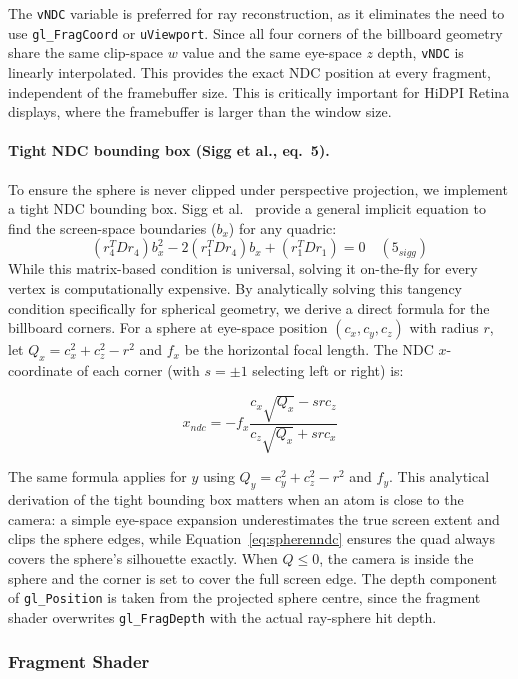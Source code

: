 \documentclass[12pt, a4paper]{article}
\begin{document}
The \texttt{vNDC} variable is preferred for ray reconstruction, as it eliminates the need to use \texttt{gl\_FragCoord} or \texttt{uViewport}. Since all four corners of the billboard geometry share the same clip-space $w$ value and the same eye-space $z$ depth, \texttt{vNDC} is linearly interpolated. This provides the exact NDC position at every fragment, independent of the framebuffer size. This is critically important for HiDPI Retina displays, where the framebuffer is larger than the window size.

\paragraph{Tight NDC bounding box (Sigg et al., eq.~5).}\label{sec:ndcbox}
To ensure the sphere is never clipped under perspective projection, we implement a tight NDC bounding box. Sigg et al.~\cite{sigg2006} provide a general implicit equation to find the screen-space boundaries ($b_x$) for any quadric:
$$(r_4^T D r_4)b_x^2 - 2(r_1^T D r_4)b_x + (r_1^T D r_1) = 0 \quad (5_{sigg})$$
While this matrix-based condition is universal, solving it on-the-fly for every vertex is computationally expensive. By analytically solving this tangency condition specifically for spherical geometry, we derive a direct formula for the billboard corners. For a sphere at eye-space position $(c_x, c_y, c_z)$ with radius $r$, let $Q_x = c_x^2 + c_z^2 - r^2$ and $f_x$ be the horizontal focal length. The NDC $x$-coordinate of each corner (with $s = \pm 1$ selecting left or right) is:

\begin{equation}
    x_{ndc} = -f_x \frac{c_x \sqrt{Q_x} - s r c_z}{c_z \sqrt{Q_x} + s r c_x} 
    \label{eq:spherenndc}
\end{equation}

The same formula applies for $y$ using $Q_y = c_y^2 + c_z^2 - r^2$ and $f_y$. This analytical derivation of the tight bounding box matters when an atom is close to the camera: a simple eye-space expansion underestimates the true screen extent and clips the sphere edges, while Equation~\ref{eq:spherenndc} ensures the quad always covers the sphere's silhouette exactly. When $Q \leq 0$, the camera is inside the sphere and the corner is set to cover the full screen edge. The depth component of \texttt{gl\_Position} is taken from the projected sphere centre, since the fragment shader overwrites \texttt{gl\_FragDepth} with the actual ray-sphere hit depth.

\subsubsection{Fragment Shader}
\end{document}
